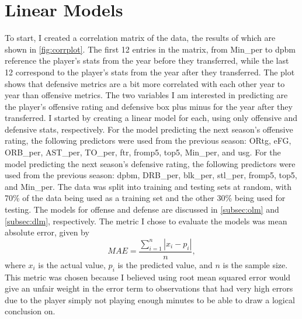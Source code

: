 \documentclass[12pt]{article}
\begin{document}
\section{Linear Models}
\label{sec:lms}
To start, I created a correlation matrix of the data, the results of which are shown in \autoref{fig:corrplot}. The first 12 entries in the matrix, from Min\_per to dpbm reference the player's stats from the year before they transferred, while the last 12 correspond to the player's stats from the year after they transferred. The plot shows that defensive metrics are a bit more correlated with each other year to year than offensive metrics. The two variables I am interested in predicting are the player's offensive rating and defensive box plus minus for the year after they transferred. I started by creating a linear model for each, using only offensive and defensive stats, respectively. For the model predicting the next season's offensive rating, the following predictors were used from the previous season: ORtg, eFG, ORB\_per, AST\_per, TO\_per, ftr, fromp5, top5, Min\_per, and usg. For the model predicting the next season's defensive rating, the following predictors were used from the previous season: dpbm, DRB\_per, blk\_per, stl\_per, fromp5, top5, and Min\_per. The data was split into training and testing sets at random, with 70\% of the data being used as a training set and the other 30\% being used for testing. The models for offense and defense are discussed in \ref{subsec:olm} and \ref{subsec:dlm}, respectively. The metric I chose to evaluate the models was mean absolute error, given by 
\begin{equation}
  MAE=\frac{\sum_{i=1}^{n}|x_{i}-p_{i}|}{n},
\end{equation}
where \(x_{i}\) is the actual value, \(p_{i}\) is the predicted value, and \(n\) is the sample size. This metric was chosen because I believed using root mean squared error would give an unfair weight in the error term to observations that had very high errors due to the player simply not playing enough minutes to be able to draw a logical conclusion on.
\end{document}
